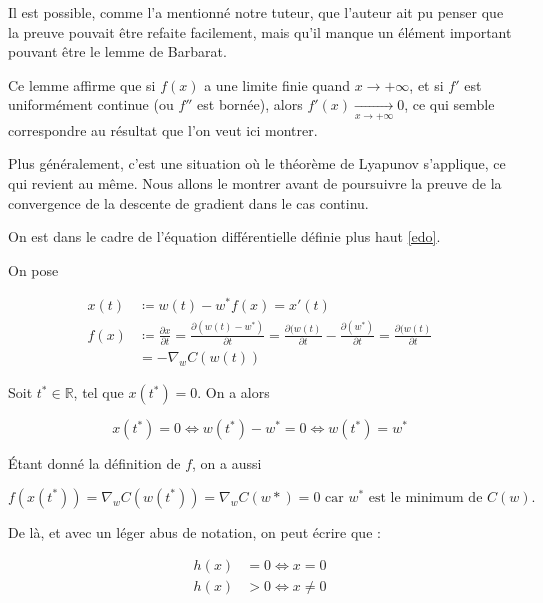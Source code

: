 \documentclass{article}
\begin{document}
Il est possible, comme l'a mentionné notre tuteur, que l'auteur ait pu penser que la preuve pouvait être refaite facilement, mais qu'il manque un élément important pouvant être le lemme de Barbarat.

Ce lemme affirme que si $f(x)$ a une limite finie quand $x \longrightarrow +\infty$, et si $f'$ est uniformément continue (ou $f''$ est bornée), alors $f'(x) \underset{x \rightarrow +\infty}{\longrightarrow} 0$, ce qui semble correspondre au résultat que l'on veut ici montrer.
\bigskip

Plus généralement, c'est une situation où le théorème de Lyapunov s'applique, ce qui revient au même. Nous allons le montrer avant de poursuivre la preuve de la convergence de la descente de gradient dans le cas continu.
\bigskip

On est dans le cadre de l'équation différentielle définie plus haut \eqref{edo}. 
\bigskip

On pose 

\begin{equation*}
    \begin{split}
        x(t) & \coloneqq w(t) - w^*f(x) =  x'(t) \\
        f(x) & \coloneqq  \frac{\partial x}{\partial t} = \frac{\partial (w(t) - w^*)}{\partial t} = \frac{\partial (w(t)}{\partial t} - \frac{\partial (w^*)}{\partial t} = \frac{\partial (w(t)}{\partial t} \\
        & = -\nabla_wC(w(t))
    \end{split}
\end{equation*}

Soit $t^* \in \mathbb{R}$, tel que $x(t^*) = 0$. On a alors 

\begin{equation*}
    x(t^*) = 0 \iff w(t^*) - w^* = 0 \iff w(t^*) = w^*
\end{equation*}

Étant donné la définition de $f$, on a aussi 

\begin{equation*}
    f(x(t^*)) = \nabla_wC(w(t^*)) = \nabla_wC(w*) = 0 \text{ car } w^* \text{ est le minimum de } C(w). 
\end{equation*}

De là, et avec un léger abus de notation, on peut écrire que :

\begin{equation*}
    \begin{split}
        h(x) & = 0 \iff x = 0 \\
        h(x) & > 0 \iff x \ne 0
    \end{split}
\end{equation*}
\end{document}
